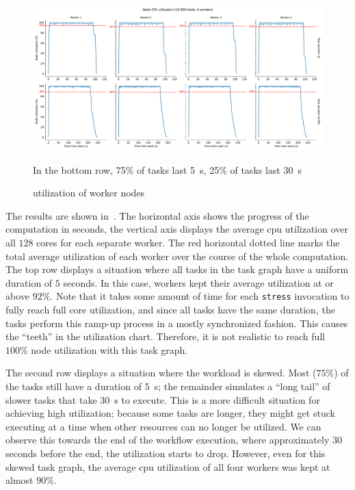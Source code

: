 \begin{figure}[h]
	\centering
	\includegraphics[width=\textwidth]{imgs/hq/charts/scalability-stress-utilization}

	In the bottom row, 75\% of tasks last \SI{5}{\second}, 25\% of tasks last
	\SI{30}{\second} \caption{ utilization of \hyperqueue{} worker nodes} \label{fig:hq-cpu-utilization}
\end{figure}

The results are shown in~. The horizontal axis shows the progress of the
computation in seconds, the vertical axis displays the average \gls{cpu} utilization
over all $128$ cores for each separate worker. The red horizontal dotted line marks the
total average utilization of each worker over the course of the whole computation. The top row
displays a situation where all tasks in the task graph have a uniform duration of
$5$ seconds. In this case, \hyperqueue{} workers kept their average
utilization at or above $92\%$. Note that it takes some amount of time for each
\texttt{stress} invocation to fully reach full core utilization, and since all tasks have
the same duration, the tasks perform this ramp-up process in a mostly synchronized fashion. This
causes the ``teeth'' in the utilization chart. Therefore, it is not realistic to reach full
$100\%$ node utilization with this task graph.

The second row displays a situation where the workload is skewed. Most ($75\%$) of
the tasks still have a duration of \SI{5}{\second}; the remainder simulates a ``long tail''
of slower tasks that take \SI{30}{\second} to execute. This is a more difficult situation
for achieving high utilization; because some tasks are longer, they might get stuck executing at a
time when other resources can no longer be utilized. We can observe this towards the end of the
workflow execution, where approximately $30$ seconds before the end, the
utilization starts to drop. However, even for this skewed task graph, the average
\gls{cpu} utilization of all four workers was kept at almost $90\%$.

